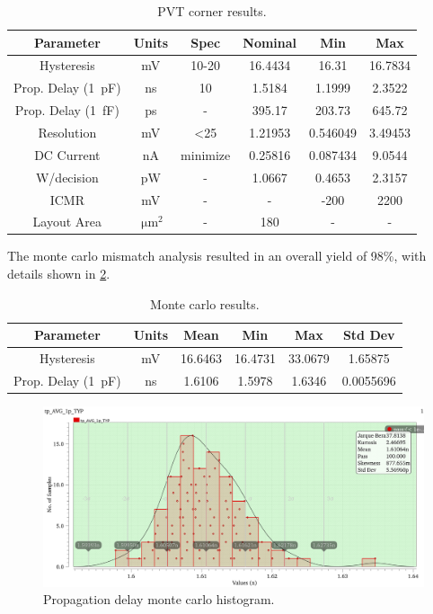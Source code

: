 \documentclass[11pt,letterpaper]{article}
\begin{document}
\begin{table}[]
    \centering
    \begin{tabular}{c|c|c|c|c|c}
    \toprule
        Parameter & Units & Spec & Nominal & Min & Max \\
    \midrule
        Hysteresis & mV & 10-20 & 16.4434 & 16.31 & 16.7834 \\
        Prop. Delay (\qty{1}{\pF}) & ns & 10 & 1.5184 & 1.1999 & 2.3522 \\
        Prop. Delay (\qty{1}{\fF}) & ps & - & 395.17 & 203.73 & 645.72 \\
        Resolution & mV & <25 & 1.21953 & 0.546049 & 3.49453 \\
        DC Current & nA & minimize & 0.25816 & 0.087434 & 9.0544 \\
        W/decision & pW & - & 1.0667 & 0.4653 & 2.3157 \\
        ICMR & mV & - & - & -200 & 2200 \\
        Layout Area & \(\qty{}{\um^2}\) & - & 180 & - & - \\
    \bottomrule
        
    \end{tabular}
    \caption{PVT corner results.}
    \label{tab:sch_corners}
\end{table}

The monte carlo mismatch analysis resulted in an overall yield of 98\%, with details shown in \cref{tab:sch_mc}.

\begin{table}[]
    \centering
    \begin{tabular}{c|c|c|c|c|c}
    \toprule
        Parameter & Units & Mean & Min & Max & Std Dev \\
    \midrule
        Hysteresis & mV & 16.6463 & 16.4731 & 33.0679 & 1.65875 \\
        Prop. Delay (\qty{1}{\pF}) & ns & 1.6106 & 1.5978 & 1.6346 & 0.0055696 \\
    \bottomrule
        
    \end{tabular}
    \caption{Monte carlo results.}
    \label{tab:sch_mc}
\end{table}

\begin{figure}[t!]
    \centering
    \includegraphics[width=\textwidth]{images/tp_avg_1p_mc.png}
    \caption{Propagation delay monte carlo histogram.}
    \label{fig:mc-plot}
\end{figure}
\end{document}
